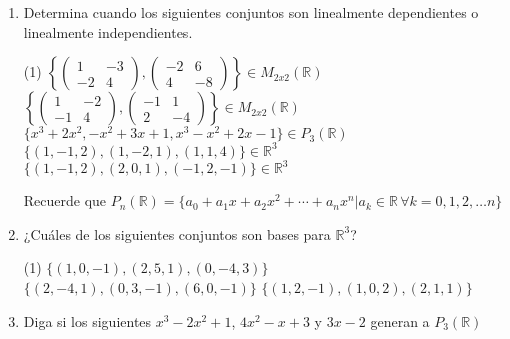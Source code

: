 \documentclass[letterpaper,11pt]{article}
\begin{document}
\begin{enumerate}




\item Determina cuando los siguientes conjuntos son linealmente dependientes o linealmente independientes.

\begin{tasks}(1)
\task $\left \lbrace \begin{pmatrix} 1 & -3 \\ -2 & 4 \end{pmatrix} , \begin{pmatrix} -2 & 6 \\ 4 & -8 \end{pmatrix} \right \rbrace \in M_{2x2}(\mathbb{R})$
\task $\left \lbrace \begin{pmatrix} 1 & -2 \\ -1 & 4 \end{pmatrix} ,\begin{pmatrix} -1 & 1 \\ 2 & -4 \end{pmatrix}  \right \rbrace \in M_{2x2}(\mathbb{R})$
\task $\lbrace x^{3} + 2x^{2}, -x^{2} + 3x + 1, x^{3} - x^{2} + 2x -1 \rbrace \in P_{3}(\mathbb{R})$ \task $\lbrace (1,-1,2), (1,-2,1), (1,1,4) \rbrace \in \mathbb{R}^{3}$
\task $\lbrace (1,-1,2), (2,0,1),(-1,2,-1)\rbrace \in \mathbb{R}^{3}$
\end{tasks}
Recuerde que $P_{n}(\mathbb{R}) = \{ a_0 +  a_1x +  a_2x^2 + \cdots +  a_n x^n \big\vert a_k \in \mathbb{R} \,  \forall k = 0,1,2,\dots n\}$

\item ¿Cuáles de los siguientes conjuntos son bases para $\mathbb{R}^{3}$?
\begin{tasks}(1)
\task  $\lbrace (1,0,-1),(2,5,1),(0,-4,3) \rbrace$
\task $\lbrace (2,-4,1),(0,3,-1),(6,0,-1) \rbrace$
\task $\lbrace (1,2,-1),(1,0,2),(2,1,1) \rbrace$
\end{tasks}


\item Diga si los siguientes $x^{3} - 2x^{2} +1$,  $4x^{2} - x + 3$ y $3x - 2$ generan a $P_{3}(\mathbb{R})$


\end{enumerate}
\end{document}
